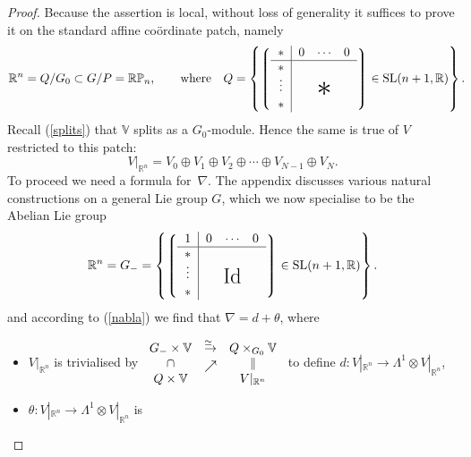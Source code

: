 \documentclass[pdftex]{sigma}
\begin{document}
\begin{proof}
Because the assertion is local, without loss of generality it suf\/f\/ices to prove
it on the standard af\/f\/ine co\"ordinate patch, namely
\begin{gather}\label{Q}
{\mathbb{R}}^n=Q/G_0\subset G/P={\mathbb{RP}}_n,\qquad\mbox{where}\quad
Q=\left\{
\left\lgroup\begin{tabular}{c|ccc}$\ast$&$0$&$\!\cdots\!$&$0$\\ \hline
$\ast$\\
\raisebox{2pt}[15pt]{$\vdots$}&&
\raisebox{-2pt}[0pt][0pt]{\makebox[0pt]{\Huge$\ast$}}\\
$\ast$\end{tabular}\right\rgroup\in{\mathrm{SL}}(n+1,{\mathbb{R}})\right\}.\!\!\!\!
\end{gather}
Recall (\ref{splits}) that ${\mathbb{V}}$ splits as a $G_0$-module. Hence the
same is true of $V$ restricted to this patch:%
\begin{equation}\label{Vsplitting}V|_{{\mathbb{R}}^n}
=V_0\oplus V_1\oplus V_2\oplus\cdots\oplus V_{N-1}\oplus V_N.\end{equation}
To proceed we need a formula for~$\nabla$. The appendix discusses various
natural constructions on a general Lie group $G$, which we now specialise to
be the Abelian Lie group
\[{\mathbb{R}}^n=
G_-=\left\{
\left\lgroup\begin{tabular}{c|ccc}$1$&$0$&$\!\cdots\!$&$0$\\ \hline
$\ast$\\
\raisebox{2pt}[15pt]{$\vdots$}&&
\raisebox{-2pt}[0pt][0pt]{\makebox[0pt]{\LARGE${\mathrm{Id}}$}}\\
$\ast$\end{tabular}\right\rgroup\in{\mathrm{SL}}(n+1,{\mathbb{R}})\right\}.\]
and according to (\ref{nabla}) we f\/ind that $\nabla=d+\theta$, where
\begin{itemize}\itemsep=0pt
\item $V|_{{\mathbb{R}}^n}$ is trivialised by
$\begin{array}{ccc}G_-\times{\mathbb{V}}&
\stackrel{\simeq\:\:}{\rightarrow}&Q\times_{G_0}{\mathbb{V}}\\
\cap&\raisebox{-2pt}{$\nearrow$}&\|\\
Q\times{\mathbb{V}}&&V|_{{\mathbb{R}}^n}
\end{array}$ to def\/ine
$d:V|_{{\mathbb{R}}^n}\to\Lambda^1\otimes V|_{{\mathbb{R}}^n}$,
\item $\theta:V|_{{\mathbb{R}}^n}\to\Lambda^1\otimes V|_{{\mathbb{R}}^n}$ is

\end{itemize}
\end{proof}
\end{document}
